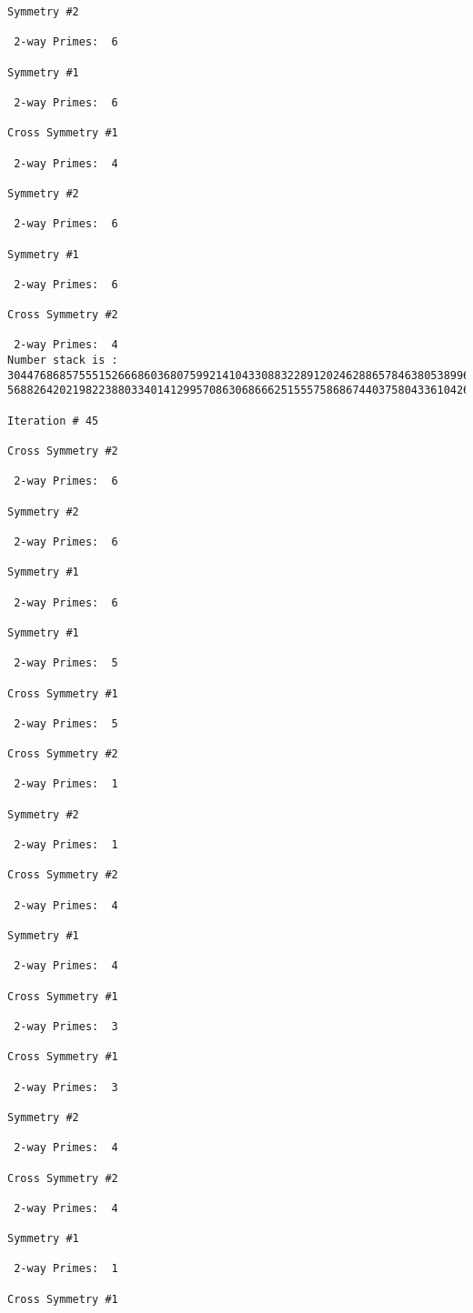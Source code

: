 \begin{verbatim}
Symmetry #2

 2-way Primes: 	6

Symmetry #1

 2-way Primes: 	6

Cross Symmetry #1

 2-way Primes: 	4

Symmetry #2

 2-way Primes: 	6

Symmetry #1

 2-way Primes: 	6

Cross Symmetry #2

 2-way Primes: 	4
Number stack is :
30447686857555152666860368075992141043308832289120246288657846380538996794608835958544046240163340857
56882642021982238803340141299570863068666251555758686744037580433610426404458595388064976998350836487

Iteration #	45

Cross Symmetry #2

 2-way Primes: 	6

Symmetry #2

 2-way Primes: 	6

Symmetry #1

 2-way Primes: 	6

Symmetry #1

 2-way Primes: 	5

Cross Symmetry #1

 2-way Primes: 	5

Cross Symmetry #2

 2-way Primes: 	1

Symmetry #2

 2-way Primes: 	1

Cross Symmetry #2

 2-way Primes: 	4

Symmetry #1

 2-way Primes: 	4

Cross Symmetry #1

 2-way Primes: 	3

Cross Symmetry #1

 2-way Primes: 	3

Symmetry #2

 2-way Primes: 	4

Cross Symmetry #2

 2-way Primes: 	4

Symmetry #1

 2-way Primes: 	1

Cross Symmetry #1


\end{verbatim}

